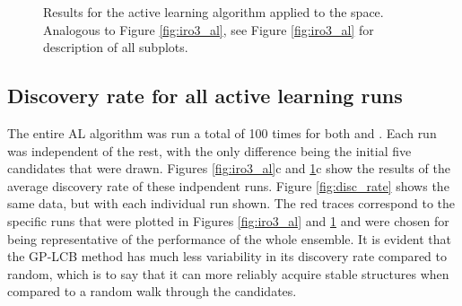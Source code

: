 \begin{figure}[!htb]
\centering
{}
\caption{\label{fig:iro2_al}
%
Results for the active learning algorithm applied to the \IrOtwo space.
%
Analogous to Figure \ref{fig:iro3_al}, see Figure \ref{fig:iro3_al} for description of all subplots.
}
\end{figure}


\subsection{Discovery rate for all active learning runs}
%

%
%
The entire AL algorithm was run a total of \num{100} times for both \IrOtwo and \IrOthree.
%
Each run was independent of the rest, with the only difference being the initial five candidates that were drawn.
%
Figures \ref{fig:iro3_al}c and \ref{fig:iro2_al}c show the results of the average discovery rate of these indpendent runs.
%
Figure \ref{fig:disc_rate} shows the same data, but with each individual run shown.
%
The red traces correspond to the specific runs that were plotted in Figures \ref{fig:iro3_al} and \ref{fig:iro2_al} and were chosen for being representative of the performance of the whole ensemble.
%
It is evident that the GP-LCB method has much less variability in its discovery rate compared to random, which is to say that it can more reliably acquire stable structures when compared to a random walk through the candidates.

